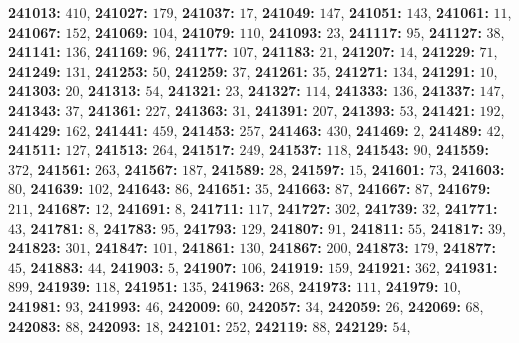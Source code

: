 \textsf{\bfseries 241013:} $410$, \textsf{\bfseries 241027:} $179$, \textsf{\bfseries 241037:} $17$, \textsf{\bfseries 241049:} $147$, \textsf{\bfseries 241051:} $143$, \textsf{\bfseries 241061:} $11$, \textsf{\bfseries 241067:} $152$, \textsf{\bfseries 241069:} $104$, \textsf{\bfseries 241079:} $110$, \textsf{\bfseries 241093:} $23$, \textsf{\bfseries 241117:} $95$, \textsf{\bfseries 241127:} $38$, \textsf{\bfseries 241141:} $136$, \textsf{\bfseries 241169:} $96$, \textsf{\bfseries 241177:} $107$, \textsf{\bfseries 241183:} $21$, \textsf{\bfseries 241207:} $14$, \textsf{\bfseries 241229:} $71$, \textsf{\bfseries 241249:} $131$, \textsf{\bfseries 241253:} $50$, \textsf{\bfseries 241259:} $37$, \textsf{\bfseries 241261:} $35$, \textsf{\bfseries 241271:} $134$, \textsf{\bfseries 241291:} $10$, \textsf{\bfseries 241303:} $20$, \textsf{\bfseries 241313:} $54$, \textsf{\bfseries 241321:} $23$, \textsf{\bfseries 241327:} $114$, \textsf{\bfseries 241333:} $136$, \textsf{\bfseries 241337:} $147$, \textsf{\bfseries 241343:} $37$, \textsf{\bfseries 241361:} $227$, \textsf{\bfseries 241363:} $31$, \textsf{\bfseries 241391:} $207$, \textsf{\bfseries 241393:} $53$, \textsf{\bfseries 241421:} $192$, \textsf{\bfseries 241429:} $162$, \textsf{\bfseries 241441:} $459$, \textsf{\bfseries 241453:} $257$, \textsf{\bfseries 241463:} $430$, \textsf{\bfseries 241469:} $2$, \textsf{\bfseries 241489:} $42$, \textsf{\bfseries 241511:} $127$, \textsf{\bfseries 241513:} $264$, \textsf{\bfseries 241517:} $249$, \textsf{\bfseries 241537:} $118$, \textsf{\bfseries 241543:} $90$, \textsf{\bfseries 241559:} $372$, \textsf{\bfseries 241561:} $263$, \textsf{\bfseries 241567:} $187$, \textsf{\bfseries 241589:} $28$, \textsf{\bfseries 241597:} $15$, \textsf{\bfseries 241601:} $73$, \textsf{\bfseries 241603:} $80$, \textsf{\bfseries 241639:} $102$, \textsf{\bfseries 241643:} $86$, \textsf{\bfseries 241651:} $35$, \textsf{\bfseries 241663:} $87$, \textsf{\bfseries 241667:} $87$, \textsf{\bfseries 241679:} $211$, \textsf{\bfseries 241687:} $12$, \textsf{\bfseries 241691:} $8$, \textsf{\bfseries 241711:} $117$, \textsf{\bfseries 241727:} $302$, \textsf{\bfseries 241739:} $32$, \textsf{\bfseries 241771:} $43$, \textsf{\bfseries 241781:} $8$, \textsf{\bfseries 241783:} $95$, \textsf{\bfseries 241793:} $129$, \textsf{\bfseries 241807:} $91$, \textsf{\bfseries 241811:} $55$, \textsf{\bfseries 241817:} $39$, \textsf{\bfseries 241823:} $301$, \textsf{\bfseries 241847:} $101$, \textsf{\bfseries 241861:} $130$, \textsf{\bfseries 241867:} $200$, \textsf{\bfseries 241873:} $179$, \textsf{\bfseries 241877:} $45$, \textsf{\bfseries 241883:} $44$, \textsf{\bfseries 241903:} $5$, \textsf{\bfseries 241907:} $106$, \textsf{\bfseries 241919:} $159$, \textsf{\bfseries 241921:} $362$, \textsf{\bfseries 241931:} $899$, \textsf{\bfseries 241939:} $118$, \textsf{\bfseries 241951:} $135$, \textsf{\bfseries 241963:} $268$, \textsf{\bfseries 241973:} $111$, \textsf{\bfseries 241979:} $10$, \textsf{\bfseries 241981:} $93$, \textsf{\bfseries 241993:} $46$, \textsf{\bfseries 242009:} $60$, \textsf{\bfseries 242057:} $34$, \textsf{\bfseries 242059:} $26$, \textsf{\bfseries 242069:} $68$, \textsf{\bfseries 242083:} $88$, \textsf{\bfseries 242093:} $18$, \textsf{\bfseries 242101:} $252$, \textsf{\bfseries 242119:} $88$, \textsf{\bfseries 242129:} $54$, 
